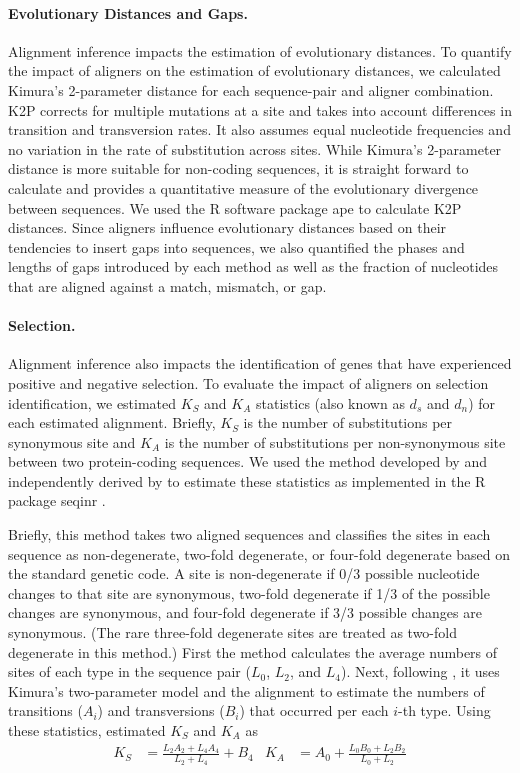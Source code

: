 \documentclass[12pt,letterpaper]{article}
\begin{document}
\paragraph{Evolutionary Distances and Gaps.}

Alignment inference impacts the estimation of evolutionary distances. To quantify the impact of aligners on the estimation of evolutionary distances, we calculated Kimura's 2-parameter distance \citep[K2P;][]{kimura1980simple} for each sequence-pair and aligner combination. K2P corrects for multiple mutations at a site and takes into account differences in transition and transversion rates. It also assumes equal nucleotide frequencies and no variation in the rate of substitution across sites. While Kimura's 2-parameter distance is more suitable for non-coding sequences, it is straight forward to calculate and provides a quantitative measure of the evolutionary divergence between sequences. We used the R software package ape \citep{paradis2019ape} to calculate K2P distances.
%
Since aligners influence evolutionary distances based on their tendencies to insert gaps into sequences, we also quantified the phases and lengths of gaps introduced by each method as well as the fraction of nucleotides that are aligned against a match, mismatch, or gap.

\paragraph{Selection.}
Alignment inference also impacts the identification of genes that have experienced positive and negative selection. To evaluate the impact of aligners on selection identification, we estimated $K_S$ and $K_A$ statistics (also known as $d_s$ and $d_n$) for each estimated alignment. Briefly, $K_S$ is the number of substitutions per synonymous site and $K_A$ is the number of substitutions per non-synonymous site between two protein-coding sequences. We used the method developed by \cite{ka_ks_li_1993} and independently derived by \cite{Pamilo1993} to estimate these statistics as implemented in the R package seqinr \citep{seqinr}. 

Briefly, this method takes two aligned sequences and classifies the sites in each sequence as non-degenerate, two-fold degenerate, or four-fold degenerate based on the standard genetic code. A site is non-degenerate if 0/3 possible nucleotide changes to that site are synonymous, two-fold degenerate if 1/3 of the possible changes are synonymous, and four-fold degenerate if 3/3 possible changes are synonymous. (The rare three-fold degenerate sites are treated as two-fold degenerate in this method.) First the method calculates the average numbers of sites of each type in the sequence pair ($L_0$, $L_2$, and $L_4$). Next, following \cite{Li1985}, it uses Kimura's two-parameter model \citep{kimura1980simple} and the alignment to estimate the numbers of transitions ($A_i$) and transversions ($B_i$) that occurred per each $i$-th type. Using these statistics, \cite{ka_ks_li_1993} estimated $K_S$ and $K_A$ as
\begin{align*}
K_S &= \frac{L_2 A_2 + L_4 A_4}{L_2 + L_4} + B_4 &
K_A &= A_0 + \frac{L_0 B_0 + L_2 B_2}{L_0 + L_2}
\end{align*}
\end{document}
